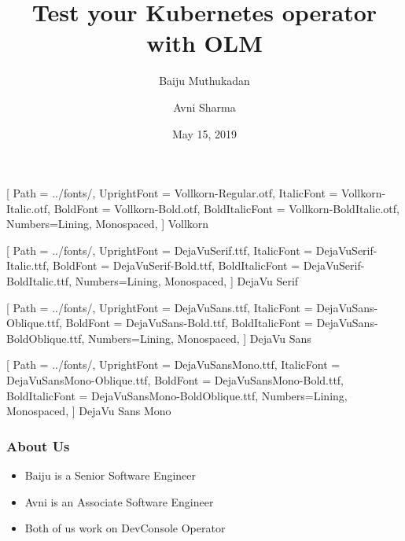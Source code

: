 \documentclass[aspectratio=169]{beamer}
\title{Test your Kubernetes operator with OLM}
\author{Baiju Muthukadan \and Avni Sharma}
\date{May 15, 2019}
\begin{document}
\beamertemplatenavigationsymbolsempty

\setmainfont
[ Path = ../fonts/,
UprightFont = DejaVuSerif.ttf,
ItalicFont = DejaVuSerif-Italic.ttf,
BoldFont = DejaVuSerif-Bold.ttf,
BoldItalicFont = DejaVuSerif-BoldItalic.ttf,
Numbers={Lining, Monospaced},
] {DejaVu Serif}

\setsansfont
[ Path = ../fonts/,
UprightFont = DejaVuSans.ttf,
ItalicFont = DejaVuSans-Oblique.ttf,
BoldFont = DejaVuSans-Bold.ttf,
BoldItalicFont = DejaVuSans-BoldOblique.ttf,
Numbers={Lining, Monospaced},
] {DejaVu Sans}

\setmonofont
[ Path = ../fonts/,
UprightFont = DejaVuSansMono.ttf,
ItalicFont = DejaVuSansMono-Oblique.ttf,
BoldFont = DejaVuSansMono-Bold.ttf,
BoldItalicFont = DejaVuSansMono-BoldOblique.ttf,
Numbers={Lining, Monospaced},
] {DejaVu Sans Mono}


\newfontfamily{\vollkorn}
[ Path = ../fonts/,
UprightFont = Vollkorn-Regular.otf,
ItalicFont = Vollkorn-Italic.otf,
BoldFont = Vollkorn-Bold.otf,
BoldItalicFont = Vollkorn-BoldItalic.otf,
Numbers={Lining, Monospaced},
] {Vollkorn}

\newfontfamily{\dejavuserif}
[ Path = ../fonts/,
UprightFont = DejaVuSerif.ttf,
ItalicFont = DejaVuSerif-Italic.ttf,
BoldFont = DejaVuSerif-Bold.ttf,
BoldItalicFont = DejaVuSerif-BoldItalic.ttf,
Numbers={Lining, Monospaced},
] {DejaVu Serif}

\newfontfamily{\dejavusans}
[ Path = ../fonts/,
UprightFont = DejaVuSans.ttf,
ItalicFont = DejaVuSans-Oblique.ttf,
BoldFont = DejaVuSans-Bold.ttf,
BoldItalicFont = DejaVuSans-BoldOblique.ttf,
Numbers={Lining, Monospaced},
] {DejaVu Sans}

\newfontfamily{\dejavumono}
[ Path = ../fonts/,
UprightFont = DejaVuSansMono.ttf,
ItalicFont = DejaVuSansMono-Oblique.ttf,
BoldFont = DejaVuSansMono-Bold.ttf,
BoldItalicFont = DejaVuSansMono-BoldOblique.ttf,
Numbers={Lining, Monospaced},
] {DejaVu Sans Mono}

\frame{\titlepage}

\begin{frame}
  \frametitle{About Us}

  \begin{itemize}
  \item<1-> Baiju is a Senior Software Engineer
  \item<2-> Avni is an Associate Software Engineer
  \item<3-> Both of us work on DevConsole Operator
  \end{itemize}

\end{frame}
\end{document}
